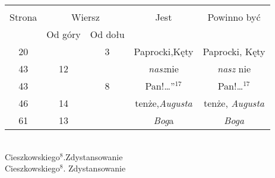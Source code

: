 \documentclass[a4paper,11pt]{article}
\begin{document}
\vspace{\spaceFour}










\newpage



\begin{center}

  \begin{tabular}{|c|c|c|c|c|}
    \hline
    & \multicolumn{2}{c|}{} & & \\
    Strona & \multicolumn{2}{c|}{Wiersz} & Jest
                              & Powinno być \\ \cline{2-3}
    & Od góry & Od dołu & & \\
    \hline
    20  & &  3 & Paprocki,Kęty & Paprocki, Kęty \\
    43  & 12 & & \textit{nasz}nie & \textit{nasz} nie \\
    43  & &  8 & Pan!\ldots”$^{ 17 }$ & Pan!\ldots$^{ 17 }$ \\
    46  & 14 & & tenże,\textit{Augusta} & tenże, \textit{Augusta} \\
    61  & 13 & & \textit{Bog}a & \textit{Boga} \\
    \hline
  \end{tabular}

\end{center}

\vspace{\spaceTwo}


\noindent
{} \\
\Jest  Cieszkowskiego$^{ 8 }$.Zdystansowanie \\
\Powin Cieszkowskiego$^{ 8 }$. Zdystansowanie \\




\end{document}
